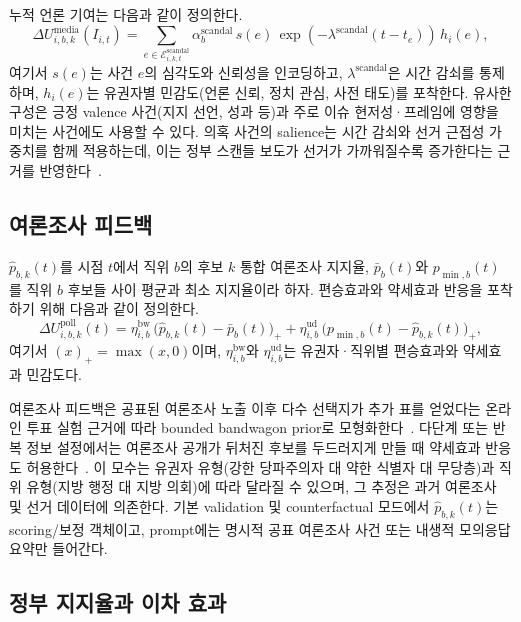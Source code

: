 \documentclass[11pt]{article}
\begin{document}
누적 언론 기여는 다음과 같이 정의한다.
\begin{equation}
\Delta U^{\text{media}}_{i,b,k}(I_{i,t}) = \sum_{e \in \mathcal{E}^{\text{scandal}}_{i,k,t}} \alpha^{\text{scandal}}_b \, s(e) \, \exp(-\lambda^{\text{scandal}} (t - t_e)) \, h_i(e),
\end{equation}
여기서 $s(e)$는 사건 $e$의 심각도와 신뢰성을 인코딩하고, $\lambda^{\text{scandal}}$은 시간 감쇠를 통제하며, $h_i(e)$는 유권자별 민감도(언론 신뢰, 정치 관심, 사전 태도)를 포착한다. 유사한 구성은 긍정 valence 사건(지지 선언, 성과 등)과 주로 이슈 현저성·프레임에 영향을 미치는 사건에도 사용할 수 있다.
의혹 사건의 salience는 시간 감쇠와 선거 근접성 가중치를 함께 적용하는데, 이는 정부 스캔들 보도가 선거가 가까워질수록 증가한다는 근거를 반영한다~\cite{garz2019scandals}.

\subsection{여론조사 피드백}

$\hat p_{b,k}(t)$를 시점 $t$에서 직위 $b$의 후보 $k$ 통합 여론조사 지지율, $\bar{p}_b(t)$와 $p_{\min,b}(t)$를 직위 $b$ 후보들 사이 평균과 최소 지지율이라 하자. 편승효과와 약세효과 반응을 포착하기 위해 다음과 같이 정의한다.
\begin{equation}
\Delta U^{\text{poll}}_{i,b,k}(t) = \eta^{\text{bw}}_{i,b} \, \big(\hat p_{b,k}(t) - \bar{p}_b(t)\big)_+ + \eta^{\text{ud}}_{i,b} \, \big(p_{\min,b}(t) - \hat p_{b,k}(t)\big)_+,
\end{equation}
여기서 $(x)_+ = \max(x,0)$이며, $\eta^{\text{bw}}_{i,b}$와 $\eta^{\text{ud}}_{i,b}$는 유권자·직위별 편승효과와 약세효과 민감도다.

여론조사 피드백은 공표된 여론조사 노출 이후 다수 선택지가 추가 표를 얻었다는 온라인 투표 실험 근거에 따라 bounded bandwagon prior로 모형화한다~\cite{farjam2021bandwagon}. 다단계 또는 반복 정보 설정에서는 여론조사 공개가 뒤처진 후보를 두드러지게 만들 때 약세효과 반응도 허용한다~\cite{morton2020underdog}. 이 모수는 유권자 유형(강한 당파주의자 대 약한 식별자 대 무당층)과 직위 유형(지방 행정 대 지방 의회)에 따라 달라질 수 있으며, 그 추정은 과거 여론조사 및 선거 데이터에 의존한다. 기본 validation 및 counterfactual 모드에서 $\hat p_{b,k}(t)$는 scoring/보정 객체이고, prompt에는 명시적 공표 여론조사 사건 또는 내생적 모의응답 요약만 들어간다.

\subsection{정부 지지율과 이차 효과}
\end{document}
